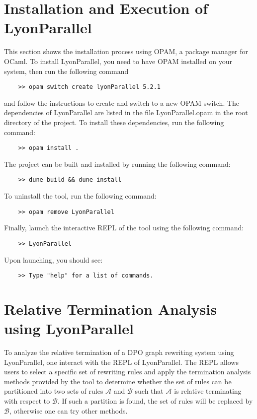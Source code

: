 \section{Installation and Execution of LyonParallel}
\label{lyonparallel:sec:installation}
This section shows the installation process using OPAM, a package manager for OCaml. To install LyonParallel, you need to have OPAM installed on your system, then 
run the following command
\begin{verbatim}
    >> opam switch create lyonParallel 5.2.1
\end{verbatim}
 and follow the instructions to create and switch to a new OPAM switch. 
 The dependencies of LyonParallel are listed in the file \colorbox{Ivory2}{LyonParallel.opam} in the root directory of the project. To install these dependencies, run the following command:
\begin{verbatim}
    >> opam install .
\end{verbatim}
The project can be built and installed by running the following command:
\begin{verbatim}
    >> dune build && dune install
\end{verbatim}
To uninstall the tool, run the following command:
\begin{verbatim}
    >> opam remove LyonParallel
\end{verbatim}
Finally, launch the interactive REPL of the tool using the following command:
\begin{verbatim}
    >> LyonParallel
\end{verbatim}
Upon launching, you should see:
\begin{verbatim}
    >> Type "help" for a list of commands.
\end{verbatim}
\section{Relative Termination Analysis using LyonParallel}
\label{lyonparallel:sec:termination}
To analyze the relative termination of a DPO graph rewriting system using LyonParallel, one interact with the REPL of LyonParallel. The REPL allows users to select a specific set of rewriting rules and apply the termination analysis methods provided by the tool to determine whether the set of rules can be partitioned into two sets of rules $\mathcal{A}$ and $\mathcal{B}$ such that $\mathcal{A}$ is relative terminating with respect to $\mathcal{B}$. If such a partition is found, the set of rules will be replaced by $\mathcal{B}$, otherwise one can try other methods.



